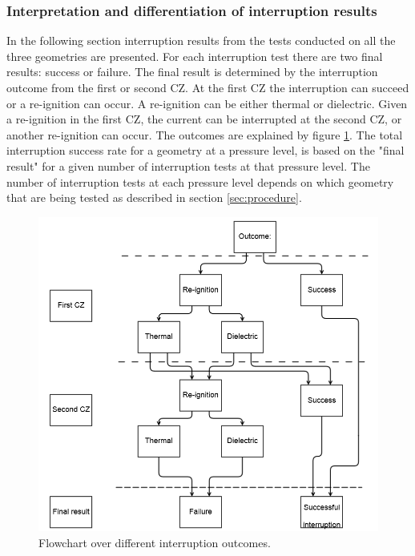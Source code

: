 \documentclass[10pt,b5paper,twoside]{article}
\begin{document}
\subsubsection{Interpretation and differentiation of interruption results}
In the following section interruption results from the tests conducted on all the three geometries are presented. For each interruption test there are two final results: success or failure. The final result is determined by the interruption outcome from the first or second CZ. At the first CZ the interruption can succeed or a re-ignition can occur. A re-ignition can be either thermal or dielectric. Given a re-ignition in the first CZ, the current can be interrupted at the second CZ, or another re-ignition can occur. The outcomes are explained by figure \ref{fig:flowchart}. The total interruption success rate for a geometry at a pressure level, is based on the "final result" for a given number of interruption tests at that pressure level. The number of interruption tests at each pressure level depends on which geometry that are being tested as described in section \ref{sec:procedure}. 

\begin{figure} [H]
\centering
\includegraphics[scale=0.6]{Bilder/Results/outcomeinterruption.png}
\caption{Flowchart over different interruption outcomes.} \label{fig:flowchart}
\end{figure}
\end{document}
